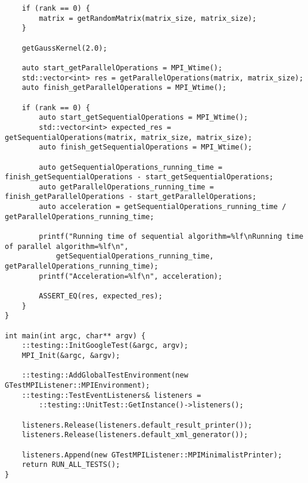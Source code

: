 \documentclass{report}
\begin{document}
\begin{lstlisting}
    if (rank == 0) {
        matrix = getRandomMatrix(matrix_size, matrix_size);
    }

    getGaussKernel(2.0);

    auto start_getParallelOperations = MPI_Wtime();
    std::vector<int> res = getParallelOperations(matrix, matrix_size);
    auto finish_getParallelOperations = MPI_Wtime();

    if (rank == 0) {
        auto start_getSequentialOperations = MPI_Wtime();
        std::vector<int> expected_res = getSequentialOperations(matrix, matrix_size, matrix_size);
        auto finish_getSequentialOperations = MPI_Wtime();

        auto getSequentialOperations_running_time = finish_getSequentialOperations - start_getSequentialOperations;
        auto getParallelOperations_running_time = finish_getParallelOperations - start_getParallelOperations;
        auto acceleration = getSequentialOperations_running_time / getParallelOperations_running_time;

        printf("Running time of sequential algorithm=%lf\nRunning time of parallel algorithm=%lf\n",
            getSequentialOperations_running_time, getParallelOperations_running_time);
        printf("Acceleration=%lf\n", acceleration);

        ASSERT_EQ(res, expected_res);
    }
}

int main(int argc, char** argv) {
    ::testing::InitGoogleTest(&argc, argv);
    MPI_Init(&argc, &argv);

    ::testing::AddGlobalTestEnvironment(new GTestMPIListener::MPIEnvironment);
    ::testing::TestEventListeners& listeners =
        ::testing::UnitTest::GetInstance()->listeners();

    listeners.Release(listeners.default_result_printer());
    listeners.Release(listeners.default_xml_generator());

    listeners.Append(new GTestMPIListener::MPIMinimalistPrinter);
    return RUN_ALL_TESTS();
}

\end{lstlisting}
\end{document}
